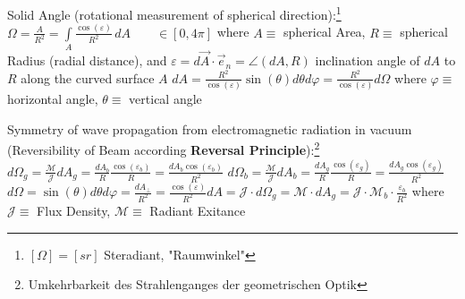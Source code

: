  Solid Angle (rotational measurement of spherical direction):\footnote{$[\Omega]=[sr]$ Steradiant, "Raumwinkel"}
\vspace{2ex} \newline 
$
\Omega = 
\frac{A}{R^2} = 
\int\limits_A \frac{\cos(\varepsilon)}{R^2} \, dA	\qquad	\in \left[ 0, 4\pi \right]
$
\vspace{2ex} \newline 
where $A \equiv$ spherical Area, $R \equiv$ spherical Radius (radial distance), and \newline
$\varepsilon = d\vec{A} \cdot \vec{e}_n = \angle(dA,R)$ inclination angle of $dA$ to $R$ along the curved surface $A$
\vspace{2ex} \newline 
$
dA = \frac{R^2}{\cos(\varepsilon)} \sin(\theta) d\theta d\varphi = \frac{R^2}{\cos(\varepsilon)}d\Omega
$
\vspace{2ex} \newline 
where $\varphi \equiv$ horizontal angle, $\theta \equiv$ vertical angle
\vspace{2ex} \newline

Symmetry of wave propagation from electromagnetic radiation in vacuum (Reversibility of Beam according \textbf{Reversal Principle}):\footnote{Umkehrbarkeit des Strahlenganges der geometrischen Optik}
\vspace{2ex} \newline 
$
d\Omega_g = 
\frac{\mathscr{M}}{\mathscr{J}} dA_g =
\frac{dA_b}{R} \frac{\cos(\varepsilon_b)}{R} = 
\frac{dA_b \cos(\varepsilon_b)}{R^2}
$
\newline
$
d\Omega_b =  
\frac{\mathscr{M}}{\mathscr{J}} dA_b =
\frac{dA_g}{R} \frac{\cos(\varepsilon_g)}{R} =  
\frac{dA_g \cos(\varepsilon_g)}{R^2}
$
\vspace{2ex} \newline 
$
d\Omega = 
\sin(\theta) d\theta d\varphi = 
\frac{dA_{\perp}}{R^2} = 
\frac{\cos(\varepsilon)}{R^2}dA = 
\mathscr{J} \cdot d\Omega_g = \mathscr{M} \cdot dA_g =
\mathscr{J} \cdot \mathscr{M}_b \cdot \frac{\varepsilon_b}{R^2}
$
\vspace{2ex} \newline 
where 
$\mathscr{J} \equiv$ Flux Density,
$\mathscr{M} \equiv$ Radiant Exitance
